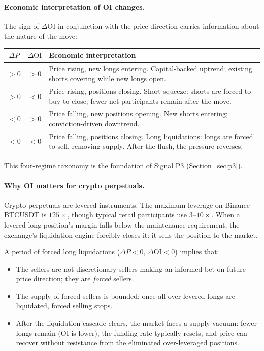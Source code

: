 \documentclass[12pt, a4paper]{article}
\theoremstyle{plain}
\theoremstyle{definition}
\newcommand{\OI}{\mathrm{OI}}
\begin{document}
\paragraph{Economic interpretation of OI changes.}
The sign of $\Delta\OI$ in conjunction with the price direction carries
information about the nature of the move:

\begin{center}
\begin{tabular}{ccp{9cm}}
\toprule
$\Delta P$ & $\Delta\OI$ & Economic interpretation \\
\midrule
$>0$ & $>0$ & Price rising, new longs entering. Capital-backed uptrend; existing shorts covering while new longs open. \\
$>0$ & $<0$ & Price rising, positions closing. Short squeeze: shorts are forced to buy to close; fewer net participants remain after the move. \\
$<0$ & $>0$ & Price falling, new positions opening. New shorts entering; conviction-driven downtrend. \\
$<0$ & $<0$ & Price falling, positions closing. Long liquidations: longs are forced to sell, removing supply. After the flush, the pressure reverses. \\
\bottomrule
\end{tabular}
\end{center}

This four-regime taxonomy is the foundation of Signal P3
(Section~\ref{sec:p3}).

\paragraph{Why OI matters for crypto perpetuals.}
Crypto perpetuals are levered instruments. The maximum leverage on
Binance BTCUSDT is $125\times$, though typical retail participants
use $3$--$10\times$.  When a levered long position's margin falls below
the maintenance requirement, the exchange's liquidation engine forcibly
closes it: it sells the position to the market.

A period of forced long liquidations ($\Delta P < 0$, $\Delta\OI < 0$)
implies that:
\begin{itemize}[noitemsep]
  \item The sellers are not discretionary sellers making an informed bet
        on future price direction; they are \emph{forced} sellers.
  \item The supply of forced sellers is bounded: once all over-levered
        longs are liquidated, forced selling stops.
  \item After the liquidation cascade clears, the market faces a supply
        vacuum: fewer longs remain (OI is lower), the funding rate
        typically resets, and price can recover without resistance from
        the eliminated over-leveraged positions.
\end{itemize}
\end{document}
